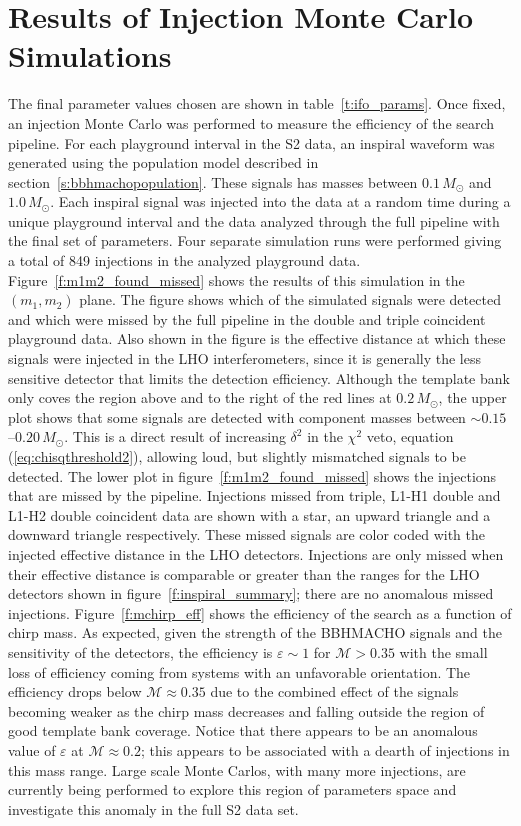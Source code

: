 \section{Results of Injection Monte Carlo Simulations}
\label{s:monte}

The final parameter values chosen are shown in table~\ref{t:ifo_params}. Once
fixed, an injection Monte Carlo was performed to measure the efficiency of the
search pipeline. For each playground interval in the S2 data, an inspiral
waveform was generated using the population model described in
section~\ref{s:bbhmachopopulation}. These signals has masses between
$0.1\,M_\odot$ and $1.0\,M_\odot$. Each inspiral signal was injected into the
data at a random time during a unique playground interval and the data
analyzed through the full pipeline with the final set of parameters. Four
separate simulation runs were performed giving a total of 849 injections in
the analyzed playground data.  Figure~\ref{f:m1m2_found_missed} shows the
results of this simulation in the $(m_1,m_2)$ plane. The figure shows which of
the simulated signals were detected and which were missed by the full pipeline
in the double and triple coincident playground data. Also shown in the figure
is the effective distance at which these signals were injected in the LHO
interferometers, since it is generally the less sensitive detector that limits
the detection efficiency.  Although the template bank only coves the region
above and to the right of the red lines at $0.2\,M_\odot$, the upper plot
shows that some signals are detected with component masses between $\sim
0.15$--$0.20\,M_\odot$. This is a direct result of increasing $\delta^2$ in
the $\chi^2$ veto, equation (\ref{eq:chisqthreshold2}), allowing loud, but
slightly mismatched signals to be detected. The lower plot in
figure~\ref{f:m1m2_found_missed} shows the injections that are missed by
the pipeline. Injections missed from triple, L1-H1 double and L1-H2 double
coincident data are shown with a star, an upward triangle and a downward
triangle respectively. These missed signals are color coded with the injected
effective distance in the LHO detectors. Injections are
only missed when their effective distance is comparable or greater than the
ranges for the LHO detectors shown in figure~\ref{f:inspiral_summary}; there
are no anomalous missed injections.  Figure~\ref{f:mchirp_eff} shows the
efficiency of the search as a function of chirp mass. As expected, given the
strength of the BBHMACHO signals and the sensitivity of the detectors, the
efficiency is $\varepsilon \sim 1$ for $\mathcal{M} >0.35$ with the small loss
of efficiency coming from systems with an unfavorable orientation. The
efficiency drops below $\mathcal{M} \approx 0.35$ due to the combined effect
of the signals becoming weaker as the chirp mass decreases and falling outside
the region of good template bank coverage.  Notice that there appears to be an
anomalous value of $\varepsilon$ at $\mathcal{M} \approx 0.2$; this appears to
be associated with a dearth of injections in this mass range.  Large scale
Monte Carlos, with many more injections, are currently being performed to
explore this region of parameters space and investigate this anomaly in the
full S2 data set.


